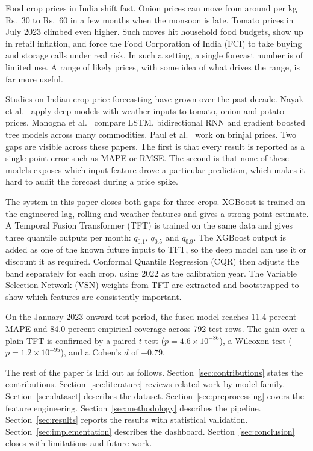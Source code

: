 \documentclass[conference,twoside]{IEEEtran}
\begin{document}
Food crop prices in India shift fast. Onion prices can move from around per kg Rs.\ 30 to Rs.\ 60 in a few months when the monsoon is late. Tomato prices in July 2023 climbed even higher. Such moves hit household food budgets, show up in retail inflation, and force the Food Corporation of India (FCI) to take buying and storage calls under real risk. In such a setting, a single forecast number is of limited use. A range of likely prices, with some idea of what drives the range, is far more useful.

Studies on Indian crop price forecasting have grown over the past decade. Nayak et al.\ \cite{nayak2024top} apply deep models with weather inputs to tomato, onion and potato prices. Manogna et al.\ \cite{manogna2025deep} compare LSTM, bidirectional RNN and gradient boosted tree models across many commodities. Paul et al.\ \cite{paul2022brinjal} work on brinjal prices. Two gaps are visible across these papers. The first is that every result is reported as a single point error such as MAPE or RMSE. The second is that none of these models exposes which input feature drove a particular prediction, which makes it hard to audit the forecast during a price spike.

The system in this paper closes both gaps for three crops. XGBoost is trained on the engineered lag, rolling and weather features and gives a strong point estimate. A Temporal Fusion Transformer (TFT) is trained on the same data and gives three quantile outputs per month: $q_{0.1}$, $q_{0.5}$ and $q_{0.9}$. The XGBoost output is added as one of the known future inputs to TFT, so the deep model can use it or discount it as required. Conformal Quantile Regression (CQR) then adjusts the band separately for each crop, using 2022 as the calibration year. The Variable Selection Network (VSN) weights from TFT are extracted and bootstrapped to show which features are consistently important.

On the January 2023 onward test period, the fused model reaches 11.4 percent MAPE and 84.0 percent empirical coverage across 792 test rows. The gain over a plain TFT is confirmed by a paired $t$-test ($p = 4.6 \times 10^{-86}$), a Wilcoxon test ($p = 1.2 \times 10^{-95}$), and a Cohen's $d$ of $-0.79$.

The rest of the paper is laid out as follows. Section~\ref{sec:contributions} states the contributions. Section~\ref{sec:literature} reviews related work by model family. Section~\ref{sec:dataset} describes the dataset. Section~\ref{sec:preprocessing} covers the feature engineering. Section~\ref{sec:methodology} describes the pipeline. Section~\ref{sec:results} reports the results with statistical validation. Section~\ref{sec:implementation} describes the dashboard. Section~\ref{sec:conclusion} closes with limitations and future work.
\end{document}
